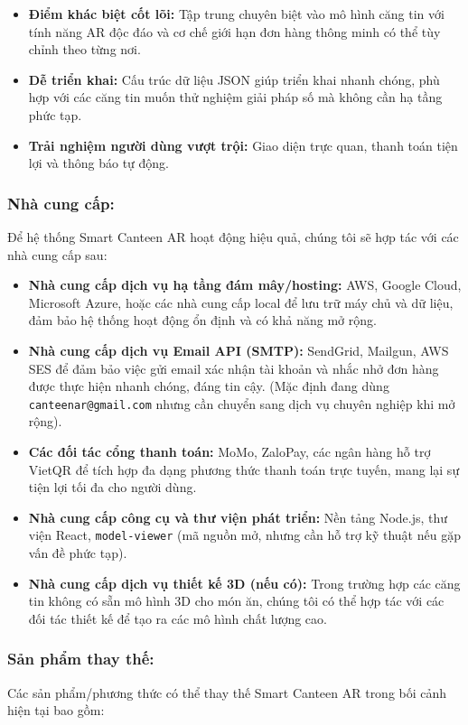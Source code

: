 \documentclass[12pt,a4paper]{article}
\begin{document}
\begin{itemize}[label=\textbullet]
    \item \textbf{Điểm khác biệt cốt lõi:} Tập trung chuyên biệt vào mô hình căng tin với tính năng AR độc đáo và cơ chế giới hạn đơn hàng thông minh có thể tùy chỉnh theo từng nơi.
    \item \textbf{Dễ triển khai:} Cấu trúc dữ liệu JSON giúp triển khai nhanh chóng, phù hợp với các căng tin muốn thử nghiệm giải pháp số mà không cần hạ tầng phức tạp.
    \item \textbf{Trải nghiệm người dùng vượt trội:} Giao diện trực quan, thanh toán tiện lợi và thông báo tự động.
\end{itemize}

\subsubsection{Nhà cung cấp:}
Để hệ thống Smart Canteen AR hoạt động hiệu quả, chúng tôi sẽ hợp tác với các nhà cung cấp sau:

\begin{itemize}[label=\textbullet]
    \item \textbf{Nhà cung cấp dịch vụ hạ tầng đám mây/hosting:} AWS, Google Cloud, Microsoft Azure, hoặc các nhà cung cấp local để lưu trữ máy chủ và dữ liệu, đảm bảo hệ thống hoạt động ổn định và có khả năng mở rộng.
    \item \textbf{Nhà cung cấp dịch vụ Email API (SMTP):} SendGrid, Mailgun, AWS SES để đảm bảo việc gửi email xác nhận tài khoản và nhắc nhở đơn hàng được thực hiện nhanh chóng, đáng tin cậy. (Mặc định đang dùng \texttt{canteenar@gmail.com} nhưng cần chuyển sang dịch vụ chuyên nghiệp khi mở rộng).
    \item \textbf{Các đối tác cổng thanh toán:} MoMo, ZaloPay, các ngân hàng hỗ trợ VietQR để tích hợp đa dạng phương thức thanh toán trực tuyến, mang lại sự tiện lợi tối đa cho người dùng.
    \item \textbf{Nhà cung cấp công cụ và thư viện phát triển:} Nền tảng Node.js, thư viện React, \texttt{model-viewer} (mã nguồn mở, nhưng cần hỗ trợ kỹ thuật nếu gặp vấn đề phức tạp).
    \item \textbf{Nhà cung cấp dịch vụ thiết kế 3D (nếu có):} Trong trường hợp các căng tin không có sẵn mô hình 3D cho món ăn, chúng tôi có thể hợp tác với các đối tác thiết kế để tạo ra các mô hình chất lượng cao.
\end{itemize}

\subsubsection{Sản phẩm thay thế:}
Các sản phẩm/phương thức có thể thay thế Smart Canteen AR trong bối cảnh hiện tại bao gồm:
\end{document}
